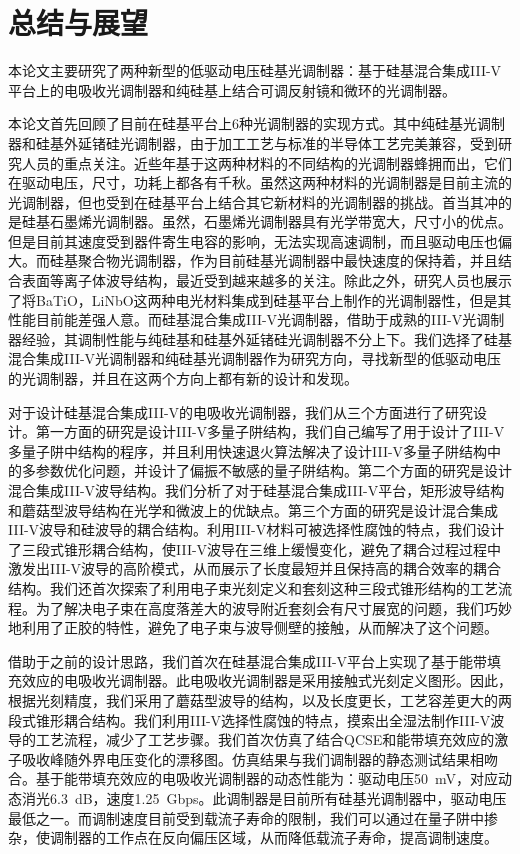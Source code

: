 \chapter{总结与展望}
本论文主要研究了两种新型的低驱动电压硅基光调制器：基于硅基混合集成III-V平台上的电吸收光调制器和纯硅基上结合可调反射镜和微环的光调制器。

本论文首先回顾了目前在硅基平台上6种光调制器的实现方式。其中纯硅基光调制器和硅基外延锗硅光调制器，由于加工工艺与标准的半导体工艺完美兼容，受到研究人员的重点关注。近些年基于这两种材料的不同结构的光调制器蜂拥而出，它们在驱动电压，尺寸，功耗上都各有千秋。虽然这两种材料的光调制器是目前主流的光调制器，但也受到在硅基平台上结合其它新材料的光调制器的挑战。首当其冲的是硅基石墨烯光调制器。虽然，石墨烯光调制器具有光学带宽大，尺寸小的优点。但是目前其速度受到器件寄生电容的影响，无法实现高速调制，而且驱动电压也偏大。而硅基聚合物光调制器，作为目前硅基光调制器中最快速度的保持着，并且结合表面等离子体波导结构，最近受到越来越多的关注。除此之外，研究人员也展示了将BaTiO，LiNbO这两种电光材料集成到硅基平台上制作的光调制器性，但是其性能目前能差强人意。而硅基混合集成III-V光调制器，借助于成熟的III-V光调制器经验，其调制性能与纯硅基和硅基外延锗硅光调制器不分上下。我们选择了硅基混合集成III-V光调制器和纯硅基光调制器作为研究方向，寻找新型的低驱动电压的光调制器，并且在这两个方向上都有新的设计和发现。

对于设计硅基混合集成III-V的电吸收光调制器，我们从三个方面进行了研究设计。第一方面的研究是设计III-V多量子阱结构，我们自己编写了用于设计了III-V多量子阱中结构的程序，并且利用快速退火算法解决了设计III-V多量子阱结构中的多参数优化问题，并设计了偏振不敏感的量子阱结构。第二个方面的研究是设计混合集成III-V波导结构。我们分析了对于硅基混合集成III-V平台，矩形波导结构和蘑菇型波导结构在光学和微波上的优缺点。第三个方面的研究是设计混合集成III-V波导和硅波导的耦合结构。利用III-V材料可被选择性腐蚀的特点，我们设计了三段式锥形耦合结构，使III-V波导在三维上缓慢变化，避免了耦合过程过程中激发出III-V波导的高阶模式，从而展示了长度最短并且保持高的耦合效率的耦合结构。我们还首次探索了利用电子束光刻定义和套刻这种三段式锥形结构的工艺流程。为了解决电子束在高度落差大的波导附近套刻会有尺寸展宽的问题，我们巧妙地利用了正胶的特性，避免了电子束与波导侧壁的接触，从而解决了这个问题。

借助于之前的设计思路，我们首次在硅基混合集成III-V平台上实现了基于能带填充效应的电吸收光调制器。此电吸收光调制器是采用接触式光刻定义图形。因此，根据光刻精度，我们采用了蘑菇型波导的结构，以及长度更长，工艺容差更大的两段式锥形耦合结构。我们利用III-V选择性腐蚀的特点，摸索出全湿法制作III-V波导的工艺流程，减少了工艺步骤。我们首次仿真了结合QCSE和能带填充效应的激子吸收峰随外界电压变化的漂移图。仿真结果与我们调制器的静态测试结果相吻合。基于能带填充效应的电吸收光调制器的动态性能为：驱动电压50~mV，对应动态消光6.3~dB，速度1.25~Gbps。此调制器是目前所有硅基光调制器中，驱动电压最低之一。而调制速度目前受到载流子寿命的限制，我们可以通过在量子阱中掺杂，使调制器的工作点在反向偏压区域，从而降低载流子寿命，提高调制速度。

